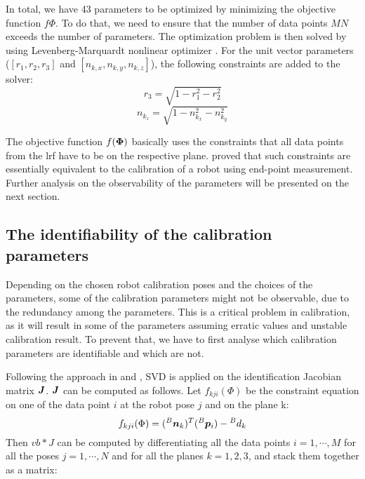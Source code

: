 In total, we have 43 parameters to be optimized by minimizing the objective function $f{\Phi}$. To do that, we need to ensure that the number of data points $MN$ exceeds the number of parameters. The optimization problem is then solved by using Levenberg-Marquardt nonlinear optimizer \cite{Newville2014}. For the unit vector parameters ($[r_1, r_2, r_3]$ and  $[n_{k,x}, n_{k,y}, n_{k,z}]$), the following constraints are added to the solver:
\begin{equation}
\label{eq:10}
r_3 = \sqrt{1 - r_1^2 - r_2^2}
\end{equation}
\begin{equation}
\label{eq:11}
n_{k_z} = \sqrt{1 - n_{k_x}^2 - n_{k_y}^2}
\end{equation}


The objective function $f(\vb*{\Phi})$ basically uses the constraints that all data points from the \ac{lrf} have to be on the respective plane. \cite{Zhuang1999} proved that such constraints are essentially equivalent to the calibration of a robot using end-point measurement. Further analysis on the observability of the parameters will be presented on the next section. 

\subsection{The identifiability of the calibration parameters}
\label{sec:third_step}

Depending on the chosen robot calibration poses and the choices of the parameters, some of the calibration parameters might not be observable, due to the redundancy among the parameters. This is a critical problem in calibration, as it will result in some of the parameters assuming erratic values and unstable calibration result. To prevent that, we have to first analyse which calibration parameters are identifiable and which are not. 

Following the approach in \cite{Hollerbach1996} and \cite{Joubair2015}, SVD is applied on the identification Jacobian matrix $\vb*{J}$. $\vb*{J}$ can be computed as follows. Let  $f_{kji}(\Phi)$ be the constraint equation on one of the data point $i$ at the robot pose $j$ and on the plane k:
\begin{equation}
 f_{kji}(\Phi) =  ({^B}\vb*{n}_k) ^T ({^B}\vb*{p}_i) - {^B}d_k
\end{equation}
Then $vb*{J}$ can be computed by differentiating all the data points $i = 1, \cdots, M$ for all the poses $j = 1, \cdots, N$ and for all the planes $k=1,2,3$, and stack them together as a matrix:

